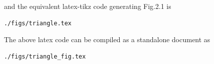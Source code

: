 \begin{enumerate}[label=\thesection.\arabic*.,ref=\thesection.\theenumi]
%
and the equivalent latex-tikz code generating Fig.2.1  is 
\begin{lstlisting}
./figs/triangle.tex
\end{lstlisting}
%
The above latex code can be compiled as a standalone document as
\begin{lstlisting}
./figs/triangle_fig.tex
\end{lstlisting}

%

%

%
%

\end{enumerate}

